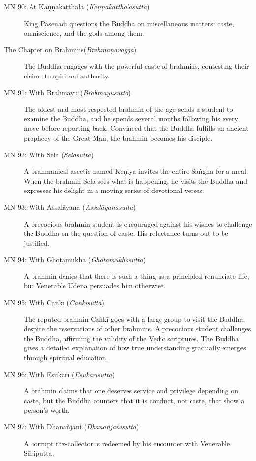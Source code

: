 \documentclass[12pt,openany]{book}%
\begin{document}
\begin{description}
\item[MN 90: At \textsanskrit{Kaṇṇakatthala} (\textit{\textsanskrit{Kaṇṇakatthalasutta}})] King Pasenadi questions the Buddha on miscellaneous matters: caste, omniscience, and the gods among them.%
\item[The Chapter on Brahmins(\textit{\textsanskrit{Brāhmaṇavagga}})] The Buddha engages with the powerful caste of brahmins, contesting their claims to spiritual authority.%
\item[MN 91: With \textsanskrit{Brahmāyu} (\textit{\textsanskrit{Brahmāyusutta}})] The oldest and most respected brahmin of the age sends a student to examine the Buddha, and he spends several months following his every move before reporting back. Convinced that the Buddha fulfills an ancient prophecy of the Great Man, the brahmin becomes his disciple.%
\item[MN 92: With Sela (\textit{\textsanskrit{Selasutta}})] A brahmanical ascetic named \textsanskrit{Keṇiya} invites the entire \textsanskrit{Saṅgha} for a meal. When the brahmin Sela sees what is happening, he visits the Buddha and expresses his delight in a moving series of devotional verses.%
\item[MN 93: With \textsanskrit{Assalāyana} (\textit{\textsanskrit{Assalāyanasutta}})] A precocious brahmin student is encouraged against his wishes to challenge the Buddha on the question of caste. His reluctance turns out to be justified.%
\item[MN 94: With \textsanskrit{Ghoṭamukha} (\textit{\textsanskrit{Ghoṭamukhasutta}})] A brahmin denies that there is such a thing as a principled renunciate life, but Venerable Udena persuades him otherwise.%
\item[MN 95: With \textsanskrit{Caṅkī} (\textit{\textsanskrit{Caṅkīsutta}})] The reputed brahmin \textsanskrit{Caṅkī} goes with a large group to visit the Buddha, despite the reservations of other brahmins. A precocious student challenges the Buddha, affirming the validity of the Vedic scriptures. The Buddha gives a detailed explanation of how true understanding gradually emerges through spiritual education.%
\item[MN 96: With \textsanskrit{Esukārī} (\textit{\textsanskrit{Esukārīsutta}})] A brahmin claims that one deserves service and privilege depending on caste, but the Buddha counters that it is conduct, not caste, that show a person’s worth.%
\item[MN 97: With \textsanskrit{Dhanañjāni} (\textit{\textsanskrit{Dhanañjānisutta}})] A corrupt tax-collector is redeemed by his encounter with Venerable \textsanskrit{Sāriputta}.%

\end{description}
\end{document}
